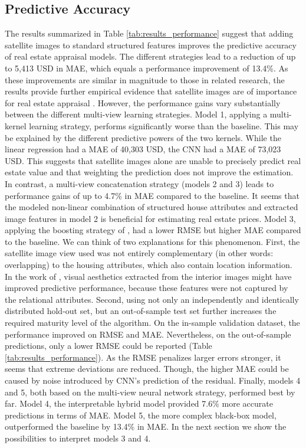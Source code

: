 \documentclass[letterpaper]{article} %
\begin{document}
\subsection{Predictive Accuracy}
The results summarized in Table \ref{tab:results_performance} suggest that adding satellite images to standard structured features improves the predictive accuracy of real estate appraisal models. The different strategies lead to a reduction of up to 5,413 USD in MAE, which equals a performance improvement of 13.4\%. As these improvements are similar in magnitude to those in related research, the results provide further empirical evidence that satellite images are of importance for real estate appraisal \cite{law2019take, bency2017beyond}. However, the performance gains vary substantially between the different multi-view learning strategies. Model 1, applying a multi-kernel learning strategy, performs significantly worse than the baseline. This may be explained by the different predictive powers of the two kernels. While the linear regression had a MAE of 40,303 USD, the CNN had a MAE of 73,023 USD. This suggests that satellite images alone are unable to precisely predict real estate value and that weighting the prediction does not improve the estimation. In contrast, a multi-view concatenation strategy (models 2 and 3) leads to performance gains of up to 4.7\% in MAE compared to the baseline. It seems that the modeled non-linear combination of structured house attributes and extracted image features in model 2 is beneficial for estimating real estate prices. Model 3, applying the boosting strategy of \citeauthor{naumzik2020one} \citeyearpar{naumzik2020one}, had a lower RMSE but higher MAE compared to the baseline. We can think of two explanations for this phenomenon. First, the satellite image view used was not entirely complementary (in other words: overlapping) to the housing attributes, which also contain location information. In the work of \citeauthor{naumzik2020one} \citeyearpar{naumzik2020one}, visual aesthetics extracted from the interior images might have improved predictive performance, because these features were not captured by the relational attributes. Second, using not only an independently and identically distributed hold-out set, but an out-of-sample test set further increases the required maturity level of the algorithm. On the in-sample validation dataset, the performance improved on RMSE and MAE. Nevertheless, on the out-of-sample predictions, only a lower RMSE could be reported (Table \ref{tab:results_performance}). As the RMSE penalizes larger errors stronger, it seems that extreme deviations are reduced.
Though, the higher MAE could be caused by noise introduced by CNN's prediction of the residual. Finally, models 4 and 5, both based on the multi-view neural network strategy, performed best by far. Model 4, the interpretable hybrid model provided 7.6\% more accurate predictions in terms of MAE. Model 5, the more complex black-box model, outperformed the baseline by 13.4\% in MAE. In the next section we show the possibilities to interpret models 3 and 4.
\end{document}
